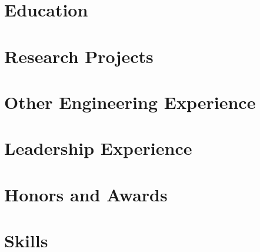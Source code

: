 \documentclass[letter,10pt]{article}
\begin{document}
\section{Education}


\section{Research Projects}


\section{Other Engineering Experience}


\section{Leadership Experience}


\section{Honors and Awards}


\section{Skills}

\end{document}
